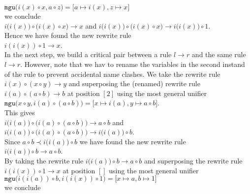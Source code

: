 \hspace*{1.3cm}
$\mathtt{mgu}\bigl(i(x) \circ x, a \circ z\bigr) = \bigl[a \mapsto i(x), z \mapsto x\bigr]$ 
\\[0.2cm]
we conclude
\\[0.2cm]
\hspace*{1.3cm}
$i\bigl(i(x)) \circ (i(x) \circ x\bigr) \rightarrow x$ \quad and \quad
$i\bigl(i(x)\bigr) \circ \bigl(i(x) \circ x\bigr) \rightarrow i\bigr(i(x)\bigr) \circ 1$. 
\\[0.2cm]
Hence we have found the new rewrite rule
\\[0.2cm]
\hspace*{1.3cm}
$i(i(x)) \circ 1 \rightarrow x$.
\\[0.2cm]
In the next step, we build a critical pair between a rule $l \rightarrow r$ and the same rule $l \rightarrow r$. 
However, note that we hav to rename the variables in the second instand of the rule to prevent accidental name
clashes.  We take the rewrite rule $i(x) \circ (x \circ y) \rightarrow y$ and superposing the (renamed) rewrite rule $i(a) \circ (a \circ b) \rightarrow b$
at position $[2]$ using the most general unifier
\\[0.2cm]
\hspace*{1.3cm}
$\mathtt{mgu}\bigl(x \circ y, i(a) \circ (a \circ b)\bigr) = \bigl[x \mapsto i(a), y \mapsto a \circ b\bigr]$.
\\[0.2cm]
This gives
\\[0.2cm]
\hspace*{1.3cm}
$i\bigl(i(a)\bigr) \circ \bigl(i(a) \circ (a \circ b)\bigr) \rightarrow a \circ b $ \quad and \quad
$i\bigl(i(a)\bigr) \circ \bigl(i(a) \circ (a \circ b)\bigr) \rightarrow i\bigl(i(a)\bigr) \circ b$.
\\[0.2cm]
Since $a \circ b \prec i\bigl(i(a)\bigr) \circ b$ we have found the new rewrite rule
\\[0.2cm]
\hspace*{1.3cm}
$i\bigl(i(a)\bigr) \circ b \rightarrow a \circ b$.
\\[0.2cm]
By taking the rewrite rule $i\bigl(i(a)\bigr) \circ b \rightarrow a \circ b$ and superposing the rewrite rule $i(i(x)) \circ 1 \rightarrow x$ at position $[]$
using the most general unifier
\\[0.2cm]
\hspace*{1.3cm}
$\mathtt{mgu}\bigl(i(i(a)) \circ b, i(i(x)) \circ 1\bigr) = \bigl[x \mapsto a, b \mapsto 1\bigr]$ 
\\[0.2cm]
we conclude
\\[0.2cm]
